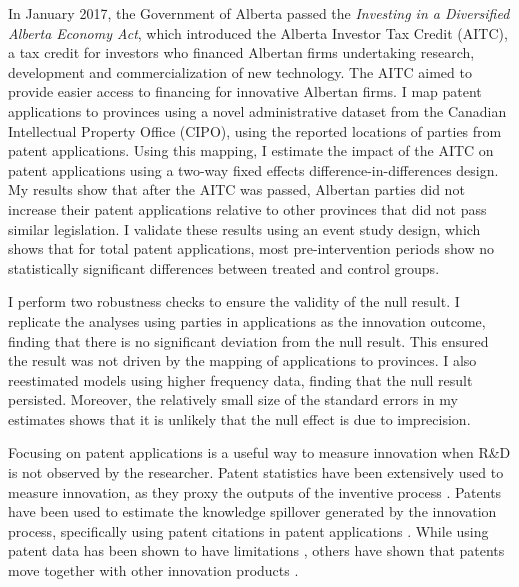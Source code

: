 \documentclass[../main.tex]{subfiles}
\begin{document}
In January 2017, the Government of Alberta passed the \textit{Investing in a Diversified Alberta Economy Act}, which introduced the Alberta Investor Tax Credit (AITC), a tax credit for investors who financed Albertan firms undertaking research, development and commercialization of new technology. The AITC aimed to provide easier access to financing for innovative Albertan firms. I map patent applications to provinces using a novel administrative dataset from the Canadian Intellectual Property Office (CIPO), using the reported locations of parties from patent applications. Using this mapping, I estimate the impact of the AITC on patent applications using a two-way fixed effects difference-in-differences design. My results show that after the AITC was passed, Albertan parties did not increase their patent applications relative to other provinces that did not pass similar legislation. I validate these results using an event study design, which shows that for total patent applications, most pre-intervention periods show no statistically significant differences between treated and control groups. 

I perform two robustness checks to ensure the validity of the null result. I replicate the analyses using parties in applications as the innovation outcome, finding that there is no significant deviation from the null result. This ensured the result was not driven by the mapping of applications to provinces. I also reestimated models using higher frequency data, finding that the null result persisted. Moreover, the relatively small size of the standard errors in my estimates shows that it is unlikely that the null effect is due to imprecision.

Focusing on patent applications is a useful way to measure innovation when R\&D is not observed by the researcher. Patent statistics have been extensively used to measure innovation, as they proxy the outputs of the inventive process \parencite{nordhaus69, pavitt85,trajtenberg90,artz_etal10}. Patents have been used to estimate the knowledge spillover generated by the innovation process, specifically using patent citations in patent applications \parencite{trajtenberg90,jaffe_etal93}. While using patent data has been shown to have limitations \parencite{lanjouw_etal98a}, others have shown that patents move together with other innovation products \parencite{lanjouw_schankerman04}.
\end{document}
